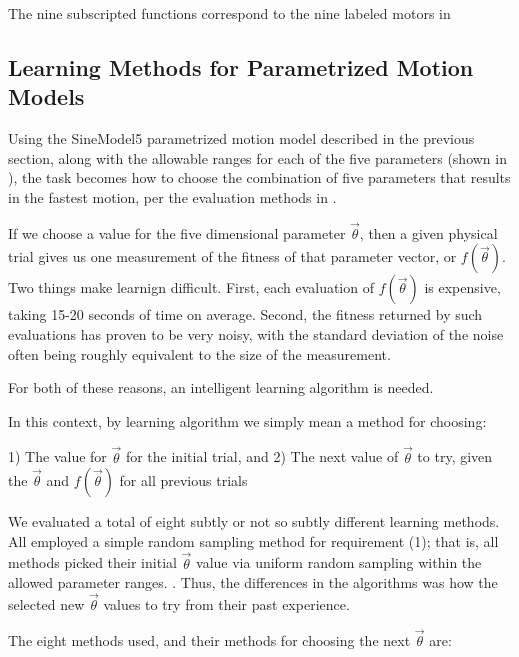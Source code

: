 The nine subscripted functions correspond to the nine labeled motors in 






\subsection{Learning Methods for Parametrized Motion Models}

Using the SineModel5 parametrized motion model described in the previous section, along with the allowable ranges for each of the five parameters (shown in ), the task becomes how to choose the combination of five parameters that results in the fastest motion, per the evaluation methods in .

If we choose a value for the five dimensional parameter $\vec{\theta}$, then a given physical trial gives us one measurement of the fitness of that parameter vector, or $f(\vec{\theta})$.  Two things make learnign difficult.  First, each evaluation of $f(\vec{\theta})$ is expensive, taking 15-20 seconds of time on average.  Second, the fitness returned by such evaluations has proven to be very noisy, with the standard deviation of the noise often being roughly equivalent to the size of the measurement.

For both of these reasons, an intelligent learning algorithm is needed.

In this context, by learning algorithm we simply mean a method for choosing:

1) The value for $\vec{\theta}$ for the initial trial, and
2) The next value of $\vec{\theta}$ to try, given the $\vec{\theta}$ and $f(\vec{\theta})$ for all previous trials

We evaluated a total of eight subtly or not so subtly different learning methods.  All employed a simple random sampling method for requirement (1); that is, all methods picked their initial $\vec{\theta}$ value via uniform random sampling within the allowed parameter ranges. .  Thus, the differences in the algorithms was how the selected new $\vec{\theta}$ values to try from their past experience.

The eight methods used, and their methods for choosing the next $\vec{\theta}$ are:




